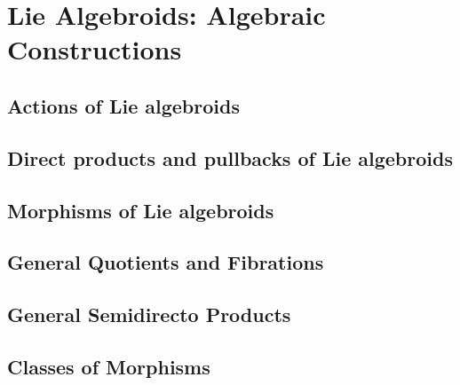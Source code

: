 \chapter{Lie Algebroids: Algebraic Constructions}

\section{Actions of Lie algebroids}

\section{Direct products and pullbacks of Lie algebroids}

\section{Morphisms of Lie algebroids}

\section{General Quotients and Fibrations}

\section{General Semidirecto Products}

\section{Classes of Morphisms}

